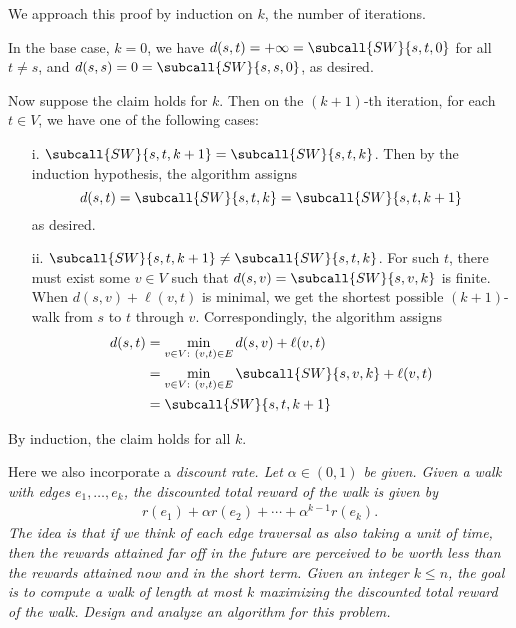 \documentclass{article}
\begin{document}
\begin{solution}
\begin{subproof}[Correctness.]
We approach this proof by induction on \( k \), the number of iterations.

In the base case, \( k=0 \), we have \( d(s,t) = +\infty = \subcall{SW}{s,t,0} \) for all \( t \not= s \), and \( d(s,s) = 0 = \subcall{SW}{s,s,0} \), as desired.

Now suppose the claim holds for \( k \). Then on the \( (k+1) \)-th iteration, for each \( t \in V \), we have one of the following cases:
\begin{enumerate}
    \item [i.] \( \subcall{SW}{s,t,k+1} = \subcall{SW}{s,t,k} \). Then by the induction hypothesis, the algorithm assigns \[d(s,t)= \subcall{SW}{s,t,k} = \subcall{SW}{s,t,k+1}\]as desired.

    \item [ii.] \( \subcall{SW}{s,t,k+1} \not= \subcall{SW}{s,t,k} \).
    For such \( t \), there must exist some \( v \in V \) such that \( d(s,v)=\subcall{SW}{s,v,k} \) is finite. When \( d(s,v) + \ell(v,t) \) is minimal, we get the shortest possible \( (k+1) \)-walk from \( s \) to \( t \) through \( v \).
    Correspondingly, the algorithm assigns
    \begin{align*}
        d(s,t)
        &= \min_{v \in V: \ (v,t) \in E} d(s,v) + \ell(v,t) \\
        &= \min_{v \in V: \ (v,t) \in E} \subcall{SW}{s,v,k} + \ell(v,t) \\
        &= \subcall{SW}{s,t,k+1}
    \end{align*}
\end{enumerate}
By induction, the claim holds for all \( k \).
\end{subproof}
\end{solution}

\pagebreak


\begin{subexercise}
  Here we also incorporate a \it{discount rate}.
  Let \( \alpha\in (0,1) \) be given.
  Given a walk with edges \( e_1,\ldots, e_k \), the \it{discounted total reward} of the walk is given by
  \begin{align*}
    r(e_1)+\alpha r(e_2) + \cdots + \alpha^{k-1}r(e_k).
  \end{align*}
  The idea is that if we think of each edge traversal as also taking a unit of time, then the rewards attained far off in the future are perceived to be worth less than the rewards attained now and in the short term.
  Given an integer \( k \leq n \), the goal is to compute a walk of length at most \( k \) maximizing the discounted total reward of the walk.
  Design and analyze an algorithm for this problem.
\end{subexercise}
\end{document}
